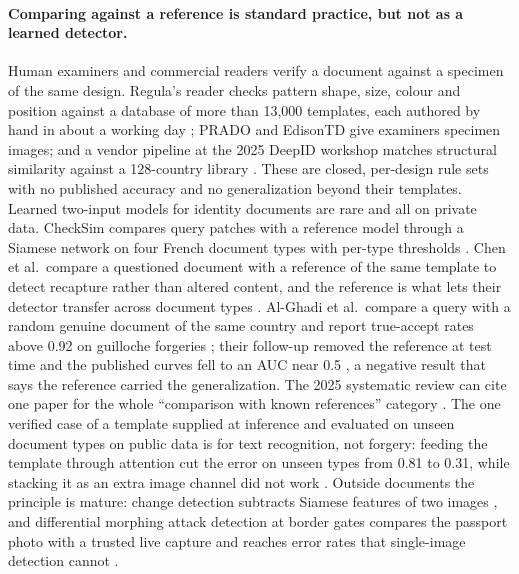 \documentclass[11pt,a4paper]{article}
\begin{document}
\paragraph{Comparing against a reference is standard practice, but not as a learned detector.} Human examiners and commercial readers verify a document against a specimen of the same design. Regula's reader checks pattern shape, size, colour and position against a database of more than 13,000 templates, each authored by hand in about a working day \cite{regula2023templates}; PRADO and EdisonTD give examiners specimen images; and a vendor pipeline at the 2025 DeepID workshop matches structural similarity against a 128-country library \cite{idakto2025embedded}. These are closed, per-design rule sets with no published accuracy and no generalization beyond their templates. Learned two-input models for identity documents are rare and all on private data. CheckSim compares query patches with a reference model through a Siamese network on four French document types with per-type thresholds \cite{ghanmi2021checksim}. Chen et al.\ compare a questioned document with a reference of the same template to detect recapture rather than altered content, and the reference is what lets their detector transfer across document types \cite{chen2022domain}. Al-Ghadi et al.\ compare a query with a random genuine document of the same country and report true-accept rates above 0.92 on guilloche forgeries \cite{alghadi2022guilloche}; their follow-up removed the reference at test time and the published curves fell to an AUC near 0.5 \cite{alghadi2023fmidv}, a negative result that says the reference carried the generalization. The 2025 systematic review can cite one paper for the whole ``comparison with known references'' category \cite{ruiz2025review}. The one verified case of a template supplied at inference and evaluated on unseen document types on public data is for text recognition, not forgery: feeding the template through attention cut the error on unseen types from 0.81 to 0.31, while stacking it as an extra image channel did not work \cite{neitthoffer2023knowledge}. Outside documents the principle is mature: change detection subtracts Siamese features of two images \cite{daudt2018fcsiamdiff,fang2023changer}, and differential morphing attack detection at border gates compares the passport photo with a trusted live capture and reaches error rates that single-image detection cannot \cite{scherhag2020dmad}.
\end{document}
